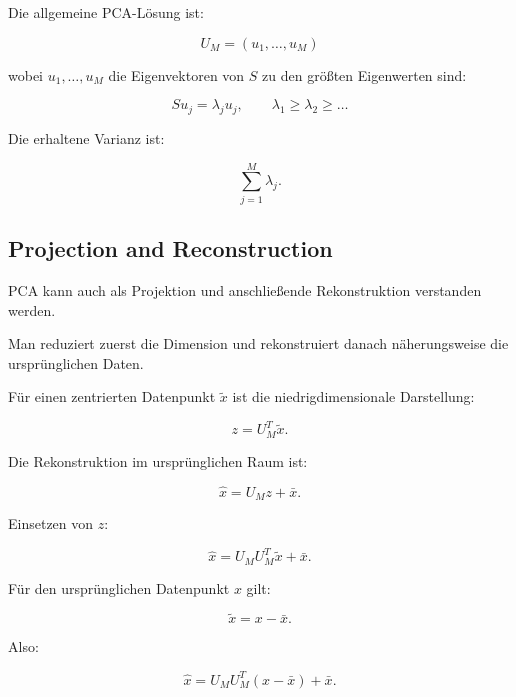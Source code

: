 \documentclass[11pt,a4paper]{scrartcl}
\begin{document}
\begin{answerbox}
    Die allgemeine PCA-Lösung ist:

    \[
        \boxed{
            U_M
            =
            (u_1,\dots,u_M)
        }
    \]

    wobei \(u_1,\dots,u_M\) die Eigenvektoren von \(S\) zu den größten
    Eigenwerten sind:

    \[
        \boxed{
            Su_j=\lambda_j u_j,
            \qquad
            \lambda_1 \geq \lambda_2 \geq \dots
        }
    \]

    Die erhaltene Varianz ist:

    \[
        \boxed{
            \sum_{j=1}^{M}\lambda_j.
        }
    \]
\end{answerbox}

\subsection{Projection and Reconstruction}

\begin{notebox}
    PCA kann auch als Projektion und anschließende Rekonstruktion verstanden
    werden.

    Man reduziert zuerst die Dimension und rekonstruiert danach näherungsweise
    die ursprünglichen Daten.
\end{notebox}

\begin{calculationbox}
    Für einen zentrierten Datenpunkt \(\tilde x\) ist die niedrigdimensionale
    Darstellung:

    \[
        z
        =
        U_M^T \tilde x.
    \]

    Die Rekonstruktion im ursprünglichen Raum ist:

    \[
        \hat x
        =
        U_M z + \bar x.
    \]

    Einsetzen von \(z\):

    \[
        \hat x
        =
        U_M U_M^T \tilde x + \bar x.
    \]

    Für den ursprünglichen Datenpunkt \(x\) gilt:

    \[
        \tilde x = x-\bar x.
    \]

    Also:

    \[
        \hat x
        =
        U_M U_M^T (x-\bar x) + \bar x.
    \]
\end{calculationbox}
\end{document}

